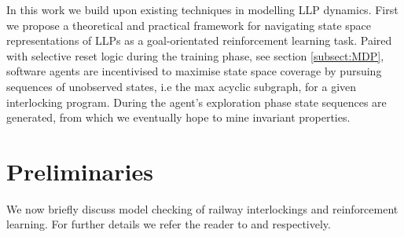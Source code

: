 \documentclass[conference,compsoc]{IEEEtran}
\begin{document}

In this work we build upon existing techniques in modelling LLP dynamics. First we propose a theoretical and practical framework for navigating state space representations of LLPs as a goal-orientated reinforcement learning task. Paired with selective reset logic during the training phase, see section \ref{subsect:MDP}, software agents are incentivised to maximise state space coverage by pursuing sequences of unobserved states, i.e the max acyclic subgraph, for a given interlocking program.   During the agent's exploration phase state sequences are generated, from which we eventually hope to mine invariant properties. 




\section{Preliminaries}\label{sec:preliminaries}
We now briefly discuss  model checking of railway interlockings and reinforcement learning. For further details we refer the reader to \cite{kanso2009automated, james2013verification} and \cite{mnih2016asynchronous} respectively.
\end{document}
